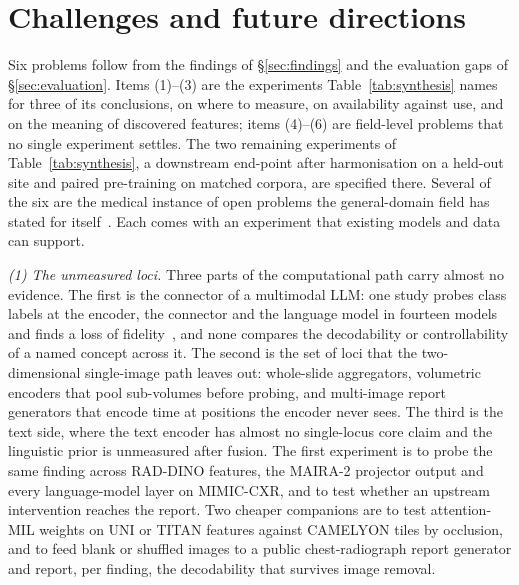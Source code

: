 \section{Challenges and future directions}
\label{sec:future}

Six problems follow from the findings of \S\ref{sec:findings} and the evaluation gaps of
\S\ref{sec:evaluation}. Items (1)--(3) are the experiments Table~\ref{tab:synthesis} names for three of
its conclusions, on where to measure, on availability against use, and on the meaning of discovered
features; items (4)--(6) are field-level problems that no single experiment settles. The two remaining
experiments of Table~\ref{tab:synthesis}, a downstream end-point after harmonisation on a held-out site
and paired pre-training on matched corpora, are specified there. Several of the six are the medical
instance of open problems the general-domain field has stated for itself~\cite{sharkey2025open}.
Each comes with an experiment that existing models and data
can support.

\textit{(1) The unmeasured loci.} Three parts of the computational path carry almost no evidence. The
first is the connector of a multimodal LLM: one study probes class labels at the encoder, the connector
and the language model in fourteen models and finds a loss of fidelity~\cite{zhu2026lost}, and none
compares the decodability or controllability of a named concept across it. The second is the set of
loci that the two-dimensional single-image path leaves out: whole-slide aggregators, volumetric
encoders that pool sub-volumes before probing, and multi-image report generators that encode time at
positions the encoder never sees. The third is the text side, where the text encoder has almost no
single-locus core claim and the linguistic prior is unmeasured after fusion. The first experiment is to
probe the same finding across RAD-DINO features, the MAIRA-2 projector output and every language-model
layer on MIMIC-CXR, and to test whether an upstream intervention reaches the report. Two cheaper
companions are to test attention-MIL weights on UNI or TITAN features against CAMELYON tiles by
occlusion, and to feed blank or shuffled images to a public chest-radiograph report generator and
report, per finding, the decodability that survives image removal.

